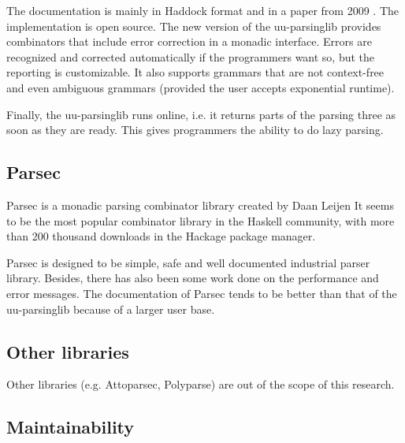 The documentation is mainly in Haddock format and in a paper from 2009 \cite{uu-doc}.
The implementation is open source.
The new version of the uu-parsinglib provides combinators that include error correction in a monadic interface.
Errors are recognized and corrected automatically if the programmers want so, but the reporting is customizable.
It also supports grammars that are not context-free and even ambiguous grammars (provided the user accepts exponential runtime).

Finally, the uu-parsinglib runs online, i.e. it returns parts of the parsing three as soon as they are ready.
This gives programmers the ability to do lazy parsing.

\subsection{Parsec}
%
Parsec is a monadic parsing combinator library created by Daan Leijen
It seems to be the most popular combinator library in the Haskell community, with more than 200 thousand downloads in the Hackage package manager.

Parsec is designed to be simple, safe and well documented industrial parser library.
Besides, there has also been some work done on the performance and error messages.
The documentation of Parsec tends to be better than that of the uu-parsinglib because of a larger user base.



\subsection{Other libraries}
Other libraries (e.g. Attoparsec, Polyparse) are out of the scope of this research.

\subsection{Maintainability}

